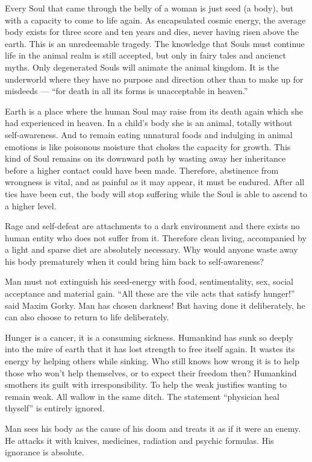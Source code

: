 \documentclass[12pt,letterpaper]{article}
\newcommand{\emdash}{---}
\begin{document}
Every Soul that came through the belly of a woman is just seed (a
body), but with a capacity to come to life again. As encapsulated
cosmic energy, the average body exists for three score and ten years
and dies, never having risen above the earth. This is an unredeemable
tragedy. The knowledge that Souls must continue life in the animal
realm is still accepted, but only in fairy tales and ancienct
myths. Only degenerated Souls will animate the animal kingdom. It is
the underworld where they have no purpose and direction other than to
make up for misdeeds {\emdash} ``for death in all its forms is
unacceptable in heaven.''

Earth is a place where the human Soul may raise from its death again
which she had experienced in heaven. In a child's body she is an
animal, totally without self-awareness. And to remain eating unnatural
foods and indulging in animal emotions is like poisonous moisture that
chokes the capacity for growth. This kind of Soul remains on its
downward path by wasting away her inheritance before a higher contact
could have been made. Therefore, abstinence from wrongness is vital,
and as painful as it may appear, it must be endured. After all ties
have been cut, the body will stop suffering while the Soul is able to
ascend to a higher level.

Rage and self-defeat are attachments to a dark environment and there
exists no human entity who does not suffer from it. Therefore clean
living, accompanied by a light and sparse diet are absolutely
necessary. Why would anyone waste away his body prematurely when it
could bring him back to self-awareness?

Man must not extinguish his seed-energy with food, sentimentality,
sex, social acceptance and material gain.  ``All these are the vile
acts that satisfy hunger!'' said Maxim Gorky. Man has chosen darkness! 
But having done it deliberately, he can also choose to return to life
deliberately.

Hunger is a cancer, it is a consuming sickness. Humankind has sunk so
deeply into the mire of earth that it has lost strength to free itself
again. It wastes its energy by helping others while sinking. Who still
knows how wrong it is to help those who won't help themselves, or to
expect their freedom then? Humankind smothers its guilt with
irresponsibility. To help the weak justifies wanting to remain
weak. All wallow in the same ditch. The statement ``physician heal
thyself'' is entirely ignored.

Man sees his body as the cause of his doom and treats it as if it were
an enemy. He attacks it with knives, medicines, radiation and psychic
formulas.  His ignorance is absolute.
\end{document}
